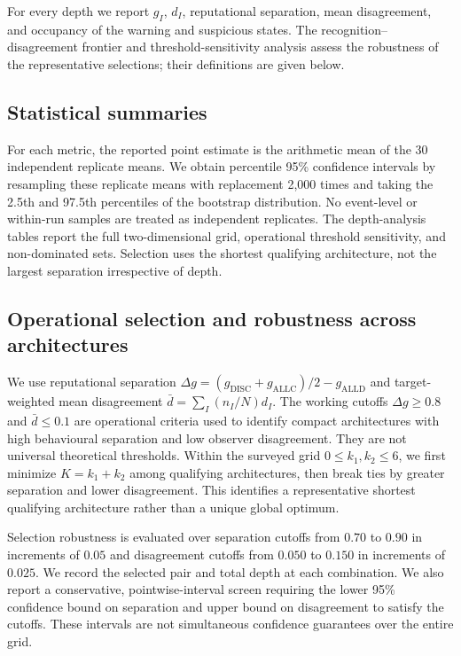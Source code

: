 \documentclass[fleqn,10pt]{wlscirep}
\begin{document}
For every depth we report $g_I$, $d_I$, reputational separation, mean disagreement, and occupancy of the warning and suspicious states. The recognition--disagreement frontier and threshold-sensitivity analysis assess the robustness of the representative selections; their definitions are given below.

\subsection{Statistical summaries}

For each metric, the reported point estimate is the arithmetic mean of the 30 independent replicate means. We obtain percentile 95\% confidence intervals by resampling these replicate means with replacement 2,000 times and taking the 2.5th and 97.5th percentiles of the bootstrap distribution. No event-level or within-run samples are treated as independent replicates. The depth-analysis tables report the full two-dimensional grid, operational threshold sensitivity, and non-dominated sets. Selection uses the shortest qualifying architecture, not the largest separation irrespective of depth.

\subsection{Operational selection and robustness across architectures}
\label{sec:si-selection-robustness}

We use reputational separation $\Delta g=(g_{\mathrm{DISC}}+g_{\mathrm{ALLC}})/2-g_{\mathrm{ALLD}}$ and target-weighted mean disagreement $\bar d=\sum_I(n_I/N)d_I$. The working cutoffs $\Delta g\geq0.8$ and $\bar d\leq0.1$ are operational criteria used to identify compact architectures with high behavioural separation and low observer disagreement. They are not universal theoretical thresholds. Within the surveyed grid $0\leq k_1,k_2\leq6$, we first minimize $K=k_1+k_2$ among qualifying architectures, then break ties by greater separation and lower disagreement. This identifies a representative shortest qualifying architecture rather than a unique global optimum.

Selection robustness is evaluated over separation cutoffs from $0.70$ to $0.90$ in increments of $0.05$ and disagreement cutoffs from $0.050$ to $0.150$ in increments of $0.025$. We record the selected pair and total depth at each combination. We also report a conservative, pointwise-interval screen requiring the lower 95\% confidence bound on separation and upper bound on disagreement to satisfy the cutoffs. These intervals are not simultaneous confidence guarantees over the entire grid.
\end{document}
